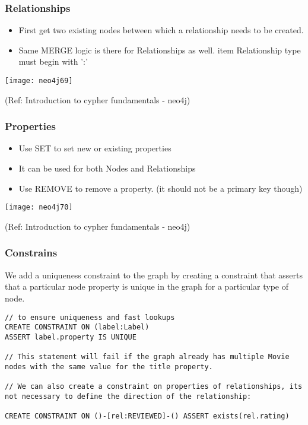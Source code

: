\begin{frame}[fragile]\frametitle{Relationships}

\begin{itemize}
\item First get two existing nodes between which a relationship needs to be created.
\item Same MERGE logic is there for Relationships as well.
item Relationship type must begin with ':'
\end{itemize}

\begin{center}
\texttt{[image: neo4j69]}
\end{center}	  


{\tiny (Ref: Introduction to cypher fundamentals  - neo4j)}

\end{frame}

\begin{frame}[fragile]\frametitle{Properties}

\begin{itemize}
\item Use SET to set new or existing properties
\item It can be used for both Nodes and Relationships
\item Use REMOVE to remove a property. (it should not be a primary key though)
\end{itemize}

\begin{center}
\texttt{[image: neo4j70]}
\end{center}	  


{\tiny (Ref: Introduction to cypher fundamentals  - neo4j)}

\end{frame}


\begin{frame}[fragile]\frametitle{Constrains}
We add a uniqueness constraint to the graph by creating a constraint that asserts that a particular node property is unique in the graph for a particular type of node.

\begin{lstlisting}
// to ensure uniqueness and fast lookups
CREATE CONSTRAINT ON (label:Label)
ASSERT label.property IS UNIQUE

// This statement will fail if the graph already has multiple Movie nodes with the same value for the title property.

// We can also create a constraint on properties of relationships, its not necessary to define the direction of the relationship:

CREATE CONSTRAINT ON ()-[rel:REVIEWED]-() ASSERT exists(rel.rating)
\end{lstlisting}	  


\end{frame}

